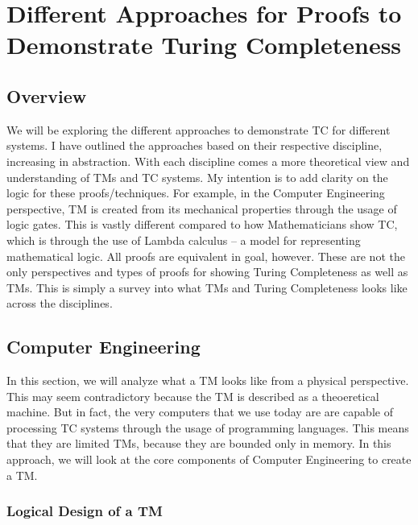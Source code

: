 \chapter{Different Approaches for Proofs to Demonstrate Turing Completeness}\label{chapter:ProofApproachesForTC}

\section{Overview}\label{sec:ProofOverview}

We will be exploring the different approaches to demonstrate TC for different systems.
I have outlined the approaches based on their respective discipline, increasing in abstraction.
With each discipline comes a more theoretical view and understanding of TMs and TC systems.
My intention is to add clarity on the logic for these proofs/techniques.
For example, in the Computer Engineering perspective, TM is created from its mechanical properties through the usage of logic gates.
This is vastly different compared to how Mathematicians show TC, which is through the use of Lambda calculus -- a model for representing mathematical logic.
All proofs are equivalent in goal, however.
These are not the only perspectives and types of proofs for showing Turing Completeness as well as TMs.
This is simply a survey into what TMs and Turing Completeness looks like across the disciplines.

\section{Computer Engineering}\label{sec:CE}

In this section, we will analyze what a TM looks like from a physical perspective.
This may seem contradictory because the TM is described as a theoeretical machine.
But in fact, the very computers that we use today are are capable of processing TC systems through the usage of programming languages.
This means that they are limited TMs, because they are bounded only in memory.
In this approach, we will look at the core components of Computer Engineering to create a TM.

\subsection{Logical Design of a TM}\label{subsec:TMLogicalDesign}

